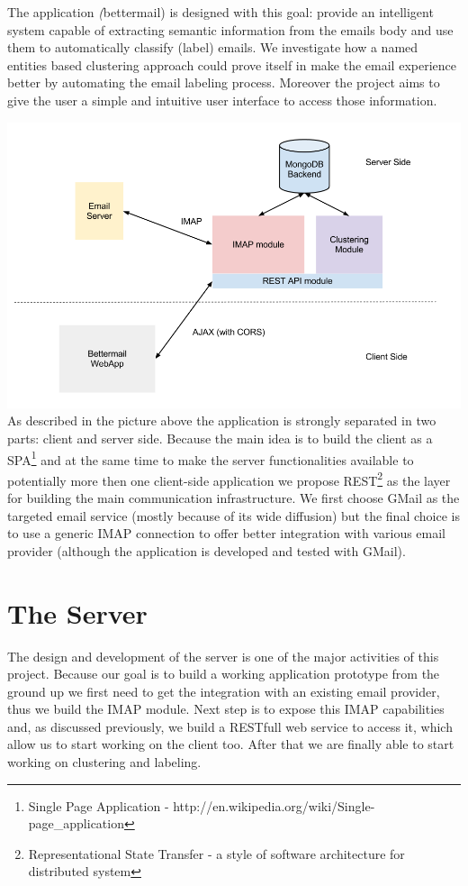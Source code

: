 \documentclass[a4paper,12pt]{report}
\begin{document}
The application \emph(bettermail) is designed with this goal: provide an intelligent system capable of extracting semantic information from the emails body and use them to automatically classify (label) emails. We investigate how a named entities based clustering approach could prove itself in make the email experience better by automating the email labeling process. Moreover the project aims to give the user a simple and intuitive user interface to access those information.

\includegraphics[width=15cm]{Architecture_Overview}
As described in the picture above the application is strongly separated in two parts: client and server side. Because the main idea is to build the client as a SPA\footnote{Single Page Application - http://en.wikipedia.org/wiki/Single-page\_application} and at the same time to make the server functionalities available to potentially more then one client-side application we propose REST\footnote{Representational State Transfer - a style of software architecture for distributed system} as the layer for building the main communication infrastructure. 
We first choose GMail as the targeted email service (mostly because of its wide diffusion) but the final choice is to use a generic IMAP connection to offer better integration with various email provider (although the application is developed and tested with GMail).
\chapter{The Server}

The design and development of the server is one of the major activities of this project. Because our goal is to build a working application prototype from the ground up we first need to get the integration with an existing email provider, thus we build the IMAP module. Next step is to expose this IMAP capabilities and, as discussed previously, we build a RESTfull web service to access it, which allow us to start working on the client too. After that we are finally able to start working on clustering and labeling.
\end{document}
